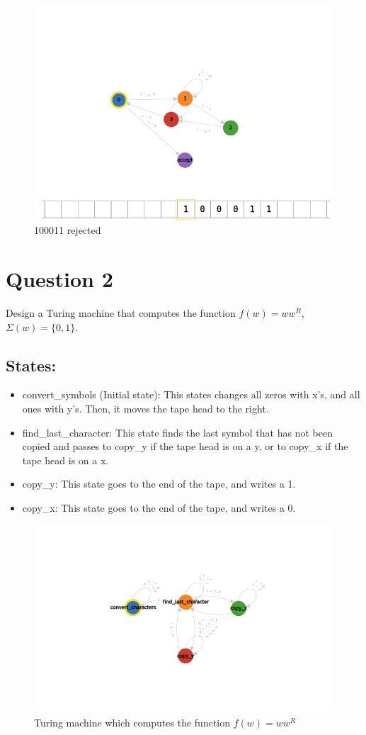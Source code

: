 \documentclass[12pt]{article}
\begin{document}
\begin{figure}[H]
    \caption{100011 rejected}
    \centering
    \includegraphics[width=12cm]{Q1/100011o.png}
\end{figure}
\newpage
\section*{Question 2}
Design a Turing machine that computes the function $f(w) = ww^R$, $\Sigma(w) = \{0, 1\}$.
\subsection*{States:}
\begin{itemize}
    \item convert{\_}symbols (Initial state): This states changes all zeros with x's, and all ones with y's. Then, it moves the tape head to the right.
    \item find{\_}last{\_}character: This state finds the last symbol that has not been copied and passes to copy{\_}y if the tape head is on a y, or to copy{\_}x if the tape head is on a x.
    \item copy{\_}y: This state goes to the end of the tape, and writes a 1.
    \item copy{\_}x: This state goes to the end of the tape, and writes a 0.
\end{itemize}
\begin{figure}[H]
    \caption{Turing machine which computes the function $f(w) = ww^R$}
    \centering
    \includegraphics[width=17cm]{Q2/turingmachine.io_.png}
\end{figure}
\newpage
\end{document}
